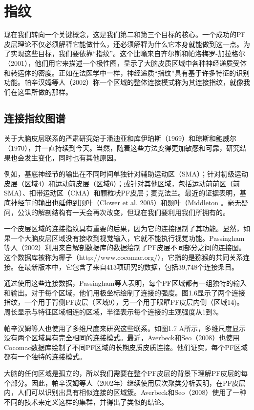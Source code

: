 \section{指纹}
现在我们转向一个关键概念，这是我们第二和第三个目标的核心。一个成功的PF皮层理论不仅必须解释它能做什么，还必须解释为什么它本身就能做到这一点。为了实现这些目标，我们要依靠“指纹”。这个比喻来自齐尔斯和帕洛梅罗-加拉格尔（2001），他们用它来描述一个极性图，显示了大脑皮质区域中各种神经递质受体和转运体的密度。正如在法医学中一样，神经递质“指纹”具有基于许多特征的识别功能。帕辛汉姆等人（2002）称一个区域的整体连接模式称为其连接指纹，就像我们在这里所做的那样。
\subsection{连接指纹图谱}
关于大脑皮层联系的严肃研究始于潘迪亚和库伊珀斯（1969）和琼斯和鲍威尔（1970），并一直持续到今天。当然，随着这些方法变得更加敏感和可靠，研究结果也会发生变化，同时也有其他原因。
\par
例如，基底神经节的输出在不同时间单独针对辅助运动区（SMA）；针对初级运动皮层（区域4）和运动前皮层（区域6）；或针对其他区域，包括运动前前区（前SMA）、扣带运动区（CMA）和颗粒状PF皮层；麦克法兰。最近的证据表明，基底神经节的输出也延伸到顶叶（Clower et al. 2005）和颞叶（Middleton 。毫无疑问，公认的解剖结构有一天会再次改变，但现在我们要利用我们所拥有的。
\par
一个皮层区域的连接指纹具有重要的后果，因为它的连接限制了其功能。显然，如果一个大脑皮层区域没有接收到视觉输入，它就不能执行视觉功能。Passingham等人（2002）利用来自解剖数据库的数据绘制了PF皮层不同部分之间的连接图。这个数据库被称为椰子（http://www.cocomac.org/），它指的是猕猴的共同关系连接。在最新版本中，它包含了来自413项研究的数据，包括39,748个连接条目。
\par
通过使用这些连接数据，Passingham等人表明，每个PF区域都有一组独特的输入和输出。对于每个区域，他们用极坐标绘制了连接的强度。图1.6显示了两个连接指纹，一个用于背侧PF皮层（区域9），另一个用于眼眶PF皮层内侧（区域14)。周长显示与特征区域相连的区域，半径表示每个连接的主观强度从1到3。
\par
帕辛汉姆等人也使用了多维尺度来研究这些联系。如图1.7 A所示，多维尺度显示没有两个区域具有完全相同的连接模式。最近，Averbeck和Seo（2008）也使用Cocomac数据库绘制了不同PF区域的长期皮质皮质连接。他们证实，每个PF区域都有一个独特的连接模式。
\par
大脑的任何区域是孤立的，所以我们需要在整个PF皮层的背景下理解PF皮层的每个部分。因此，帕辛汉姆等人（2002年）继续使用层次聚类分析表明，在PF皮层内，人们可以识别出具有相似连接的区域簇。Averbeck和Seo（2008）使用了一种不同的技术来定义这样的集群，并得出了类似的结论。
